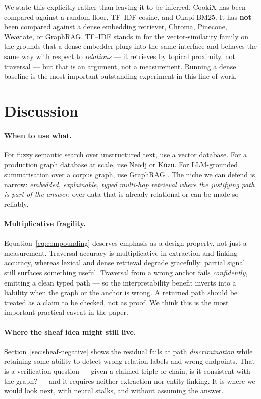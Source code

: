 \documentclass[11pt]{article}
\theoremstyle{definition}
\begin{document}
We state this explicitly rather than leaving it to be inferred. CookiX has been compared
against a random floor, TF--IDF cosine, and Okapi BM25. It has \textbf{not} been
compared against a dense embedding retriever, Chroma, Pinecone, Weaviate, or GraphRAG.
TF--IDF stands in for the vector-similarity family on the grounds that a dense embedder
plugs into the same interface and behaves the same way with respect to \emph{relations}
--- it retrieves by topical proximity, not traversal --- but that is an argument, not a
measurement. Running a dense baseline is the most important outstanding experiment in
this line of work.

\section{Discussion}

\paragraph{When to use what.} For fuzzy semantic search over unstructured text, use a
vector database. For a production graph database at scale, use Neo4j or Kùzu. For
LLM-grounded summarisation over a corpus graph, use GraphRAG \cite{edge2024local}. The
niche we can defend is narrow: \emph{embedded, explainable, typed multi-hop retrieval
where the justifying path is part of the answer}, over data that is already relational
or can be made so reliably.

\paragraph{Multiplicative fragility.} Equation~\eqref{eq:compounding} deserves emphasis
as a design property, not just a measurement. Traversal accuracy is multiplicative in
extraction and linking accuracy, whereas lexical and dense retrieval degrade gracefully:
partial signal still surfaces something useful. Traversal from a wrong anchor fails
\emph{confidently}, emitting a clean typed path --- so the interpretability benefit
inverts into a liability when the graph or the anchor is wrong. A returned path should be
treated as a claim to be checked, not as proof. We think this is the most important
practical caveat in the paper.

\paragraph{Where the sheaf idea might still live.} Section~\ref{sec:sheaf-negative}
shows the residual fails at path \emph{discrimination} while retaining some ability to
detect wrong relation labels and wrong endpoints. That is a verification question --- given
a claimed triple or chain, is it consistent with the graph? --- and it requires neither
extraction nor entity linking. It is where we would look next, with neural stalks, and
without assuming the answer.
\end{document}
